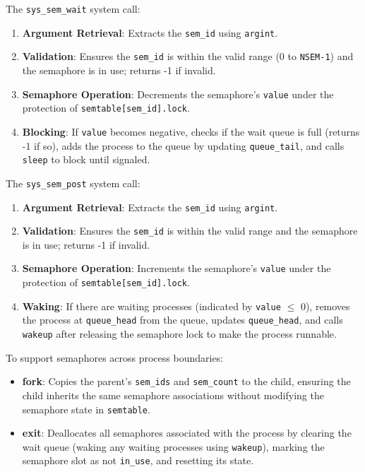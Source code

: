 \documentclass[12pt]{article}
\begin{document}
The \texttt{sys\_sem\_wait} system call:
\begin{enumerate}
  \item \textbf{Argument Retrieval}: Extracts the \texttt{sem\_id} using \texttt{argint}.
  \item \textbf{Validation}: Ensures the \texttt{sem\_id} is within the valid range (0 to \texttt{NSEM-1}) and the semaphore is in use; returns -1 if invalid.
  \item \textbf{Semaphore Operation}: Decrements the semaphore’s \texttt{value} under the protection of \texttt{semtable[sem\_id].lock}.
  \item \textbf{Blocking}: If \texttt{value} becomes negative, checks if the wait queue is full (returns -1 if so), adds the process to the queue by updating \texttt{queue\_tail}, and calls \texttt{sleep} to block until signaled.
\end{enumerate}

The \texttt{sys\_sem\_post} system call:
\begin{enumerate}
  \item \textbf{Argument Retrieval}: Extracts the \texttt{sem\_id} using \texttt{argint}.
  \item \textbf{Validation}: Ensures the \texttt{sem\_id} is within the valid range and the semaphore is in use; returns -1 if invalid.
  \item \textbf{Semaphore Operation}: Increments the semaphore’s \texttt{value} under the protection of \texttt{semtable[sem\_id].lock}.
  \item \textbf{Waking}: If there are waiting processes (indicated by \texttt{value} $\leq$ 0), removes the process at \texttt{queue\_head} from the queue, updates \texttt{queue\_head}, and calls \texttt{wakeup} after releasing the semaphore lock to make the process runnable.
\end{enumerate}

To support semaphores across process boundaries:
\begin{itemize}
  \item \textbf{fork}: Copies the parent’s \texttt{sem\_ids} and \texttt{sem\_count} to the child, ensuring the child inherits the same semaphore associations without modifying the semaphore state in \texttt{semtable}.
  \item \textbf{exit}: Deallocates all semaphores associated with the process by clearing the wait queue (waking any waiting processes using \texttt{wakeup}), marking the semaphore slot as not \texttt{in\_use}, and resetting its state.
\end{itemize}
\end{document}
